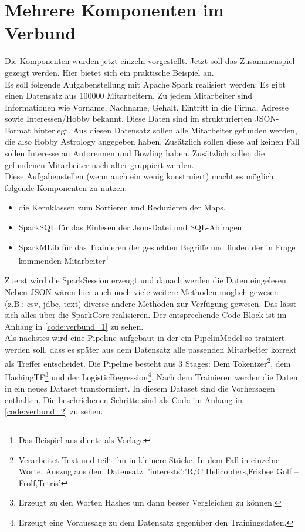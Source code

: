 
\newpage
\section{Mehrere Komponenten im Verbund}

Die Komponenten wurden jetzt einzeln vorgestellt. Jetzt soll das Zusammenspiel gezeigt werden. Hier bietet sich ein praktische Beispiel an. \\

\noindent
Es soll folgende Aufgabenstellung mit Apache Spark realisiert werden: Es gibt einen Datensatz aus 100000 Mitarbeitern. Zu jedem Mitarbeiter sind Informationen wie Vorname, Nachname, Gehalt, Eintritt in die Firma, Adresse sowie Interessen/Hobby bekannt. Diese Daten sind im strukturierten JSON-Format hinterlegt. 
Aus diesen Datensatz sollen alle Mitarbeiter gefunden werden, die also Hobby Astrology angegeben haben. Zusätzlich sollen diese auf keinen Fall sollen Interesse an Autorennen und Bowling haben. Zusätzlich sollen die gefundenen Mitarbeiter nach alter gruppiert werden. \\
Diese Aufgabenstellen (wenn auch ein wenig konstruiert) macht es möglich folgende Komponenten zu nutzen:
\begin{itemize}
	\item die Kernklassen zum Sortieren und Reduzieren der Maps.
	\item SparkSQL für das Einlesen der Json-Datei und SQL-Abfragen
	\item SparkMLib für das Trainieren der gesuchten Begriffe und finden der in Frage kommenden Mitarbeiter\footnote{Das Beispiel aus \cite{GITHUB_EXAMPLE} diente als Vorlage}	
\end{itemize}  

\noindent
Zuerst wird die SparkSession erzeugt und danach werden die Daten eingelesen. Neben JSON wären hier auch noch viele weitere Methoden möglich gewesen (z.B.: csv, jdbc, text) diverse andere Methoden zur Verfügung gewesen. Das lässt sich alles über die SparkCore realisieren. Der entsprechende Code-Block ist im Anhang in \autoref{code:verbund_1} zu sehen.\\

\noindent
Als nächstes wird eine Pipeline aufgebaut in der ein PipelinModel so trainiert werden soll, dass es später aus dem Datensatz alle passenden Mitarbeiter korrekt als Treffer entscheidet. Die Pipeline besteht aus 3 Stages: Dem Tokenizer\footnote{Verarbeitet Text und teilt ihn in kleinere Stücke. In dem Fall in einzelne Worte, Auszug aus dem Datensatz: 'interests':'R/C Helicopters,Frisbee Golf – Frolf,Tetris'}, dem HashingTF\footnote{Erzeugt zu den Worten Hashes um dann besser Vergleichen zu können.} und der LogisticRegression\footnote{Erzeugt eine Voraussage zu dem Datensatz gegenüber den Trainingsdaten.}. Nach dem Trainieren werden die Daten in ein neues Dataset transformiert. In diesem Dataset sind die Vorhersagen enthalten. Die beschriebenen Schritte sind als Code im Anhang in \autoref{code:verbund_2} zu sehen. \\

